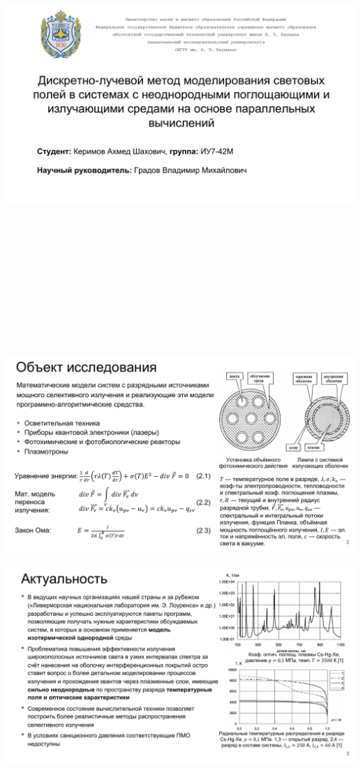 \includegraphics[angle=90,origin=c, height=180mm]{inc/img/presentation-1}

\includegraphics[angle=90,origin=c]{inc/img/presentation-2}

\includegraphics[angle=90,origin=c]{inc/img/presentation-3}

